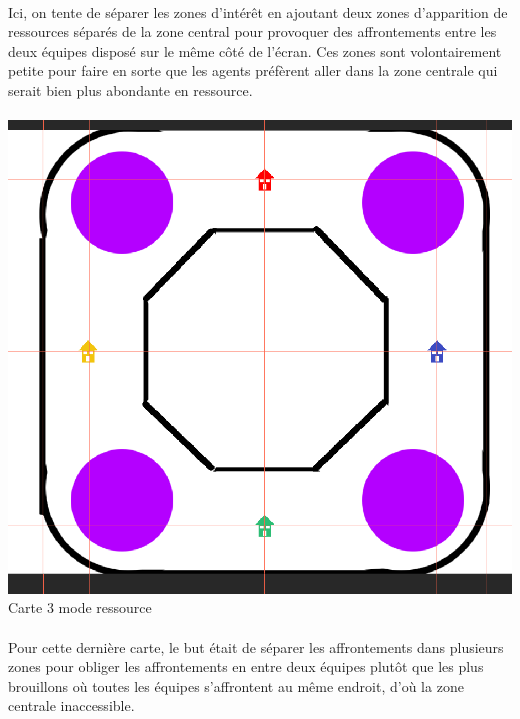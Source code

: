 \documentclass{report}
\begin{document}
\paragraph{}

Ici, on tente de séparer les zones d’intérêt en ajoutant deux zones d’apparition de ressources séparés de la zone central pour provoquer des affrontements entre les deux équipes disposé sur le même côté de l’écran. Ces zones sont volontairement petite pour faire en sorte que les agents préfèrent aller dans la zone centrale qui serait bien plus abondante en ressource.

\paragraph{}
\begin{center}
\includegraphics[scale=0.2]{DATA/carteO.png}
 {Carte 3 mode ressource}
\end{center}
\paragraph{}

Pour cette dernière carte, le but était de séparer les affrontements dans plusieurs zones pour obliger les affrontements en entre deux équipes plutôt que les plus brouillons où toutes les équipes s’affrontent au même endroit, d’où la zone centrale inaccessible.
\end{document}
